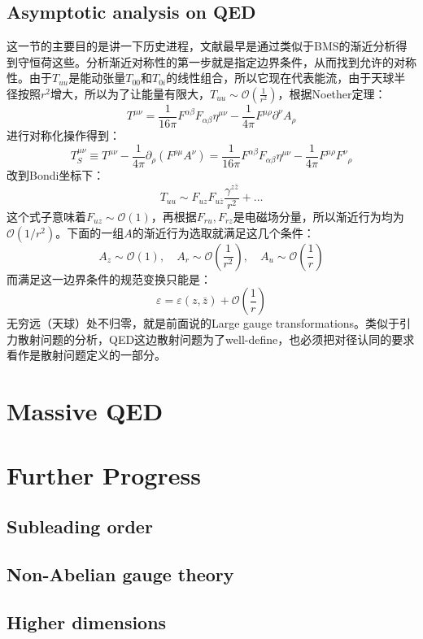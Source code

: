 \subsection{Asymptotic analysis on QED}
这一节的主要目的是讲一下历史进程，文献最早是通过类似于BMS的渐近分析得到守恒荷这些\cite{Strominger:2013lka,He:2014cra}。分析渐近对称性的第一步就是指定边界条件，从而找到允许的对称性。由于$T_{uu}$是能动张量$T_{00}$和$T_{0i}$的线性组合，所以它现在代表能流，由于天球半径按照$r^2$增大，所以为了让能量有限大，$T_{uu}\sim\mathcal{O}\left(\frac{1}{r^2}\right)$，根据Noether定理：
\begin{equation}
	T^{\mu\nu}=\frac{1}{16\pi}F^{\alpha\beta}F_{\alpha\beta}\eta^{\mu\nu}-\frac{1}{4\pi}F^{\mu\rho}\partial^{\nu}A_{\rho}
\end{equation}
进行对称化操作得到：
\begin{equation}
	T_{S}^{\mu\nu}\equiv T^{\mu\nu}-\frac{1}{4\pi}\partial_{\rho}\left(F^{\rho\mu}A^{\nu}\right)=\frac{1}{16\pi}F^{\alpha\beta}F_{\alpha\beta}\eta^{\mu\nu}-\frac{1}{4\pi}F^{\mu\rho}{F^{\nu}}_{\rho}
\end{equation}
改到Bondi坐标下：
\begin{equation}
	T_{uu}\sim F_{uz}F_{u\bar{z}}\frac{\gamma^{z\bar{z}}}{r^2}+\ldots 
\end{equation}
这个式子意味着$F_{uz}\sim\mathcal{O}(1)$，再根据$F_{ru},F_{rz}$是电磁场分量，所以渐近行为均为$\mathcal{O}(1/r^2)$。下面的一组$A$的渐近行为选取就满足这几个条件：
\begin{equation}
	A_z\sim\mathcal{O}(1),\quad A_r\sim\mathcal{O}\left(\frac{1}{r^2}\right),\quad A_u\sim\mathcal{O}\left(\frac{1}{r}\right)
\end{equation}
而满足这一边界条件的规范变换只能是：
\begin{equation}
	\varepsilon=\varepsilon(z,\bar{z})+\mathcal{O}\left(\frac1r\right)
\end{equation}
无穷远（天球）处不归零，就是前面说的Large gauge transformations。类似于引力散射问题的分析，QED这边散射问题为了well-define，也必须把对径认同的要求看作是散射问题定义的一部分。
\section{Massive QED}

\section{Further Progress}
\subsection{Subleading order}
\subsection{Non-Abelian gauge theory}
\subsection{Higher dimensions}



